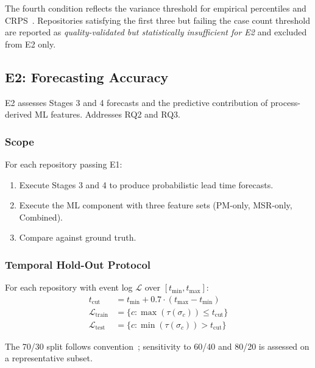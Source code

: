 The fourth condition reflects the variance threshold for empirical
percentiles and CRPS~\cite{gneiting2007strictly}. Repositories satisfying
the first three but failing the case count threshold are reported as
\emph{quality-validated but statistically insufficient for E2} and
excluded from E2 only.


\subsection{E2: Forecasting Accuracy}
\label{sec:e2-design}

E2 assesses Stages 3 and 4 forecasts and the predictive contribution of
process-derived ML features. Addresses RQ2 and RQ3.

\subsubsection{Scope}

For each repository passing E1:
\begin{enumerate}
    \item Execute Stages 3 and 4 to produce probabilistic lead time
    forecasts.
    \item Execute the ML component with three feature sets (PM-only,
    MSR-only, Combined).
    \item Compare against ground truth.
\end{enumerate}

\subsubsection{Temporal Hold-Out Protocol}
\label{sec:temporal-holdout}

\begin{definition}
\label{def:temporal-holdout}
For each repository with event log $\mathcal{L}$ over
$[t_{\min}, t_{\max}]$:
\begin{align}
t_{\text{cut}} &= t_{\min} + 0.7 \cdot (t_{\max} - t_{\min})
    \label{eq:cutoff} \\
\mathcal{L}_{\text{train}} &= \{c : \max(\tau(\sigma_c)) \leq t_{\text{cut}}\}
    \label{eq:train-set} \\
\mathcal{L}_{\text{test}}  &= \{c : \min(\tau(\sigma_c)) > t_{\text{cut}}\}
    \label{eq:test-set}
\end{align}
\end{definition}

The 70/30 split follows
convention~\cite{tashman2000out}; sensitivity to 60/40 and 80/20 is
assessed on a representative subset.

